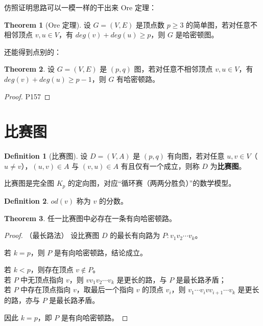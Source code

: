 \documentclass[oneside]{book}
\theoremstyle{definition}
\newtheorem{definition}{Definition}[section]
\newtheorem{theorem}{Theorem}[section]
\begin{document}
仿照证明思路可以一模一样的干出来 Ore 定理：

\begin{theorem}[Ore 定理]
	设 \( G = (V, E) \) 是顶点数 \( p \geq 3 \) 的简单图，若对任意不相邻顶点 \( v,u \in V \)，有 \( deg (v) + deg (u) \geq p \)，则 \( G \) 是哈密顿图。
\end{theorem}

还能得到点别的：
\begin{theorem}
	设 \( G = (V, E) \) 是 \((p,q)\) 图，若对任意不相邻顶点 \( v,u \in V \)，有 \( deg (v) + deg (u) \geq p-1 \)，则 \( G \) 有哈密顿路。
\end{theorem}
\begin{proof}
	P157
\end{proof}

\section{比赛图}
\begin{definition}[比赛图]
	设 \( D = (V, A) \) 是 \( (p,q) \) 有向图，若对任意 \( u, v \in V \)（\( u \neq v \)），\( (u,v) \in A \) 与 \( (v,u) \in A \) 有且仅有一个成立，则称 \( D \) 为\textbf{比赛图}。
	
	比赛图是完全图 \( K_p \) 的定向图，对应“循环赛（两两分胜负）”的数学模型。
\end{definition}
\begin{definition}
	\(od(v)\) 称为 \(v\) 的分数。
\end{definition}
\begin{theorem}
	任一比赛图中必存在一条有向哈密顿路。
\end{theorem}

\begin{proof}
	（最长路法）
	设比赛图 \( D \) 的最长有向路为 \( P: v_1v_2\cdots v_k \)。
	
	若 \( k = p \)，则 \( P \) 是有向哈密顿路，结论成立。
	
	若 \( k < p \)，则存在顶点 \( v \notin P \)。
	\\
	若 \( P \) 中无顶点指向 \( v \)，则 \( vv_1v_2\cdots v_k \) 是更长的路，与 \( P \) 是最长路矛盾；\\
	若 \( P \) 中存在顶点指向 \( v \)，取最后一个指向 \( v \) 的顶点 \( v_i \)，则 \( v_1\cdots v_ivv_{i+1}\cdots v_k \) 是更长的路，亦与 \( P \) 是最长路矛盾。
	
	因此 \( k = p \)，即 \( P \) 是有向哈密顿路。
\end{proof}
\end{document}
